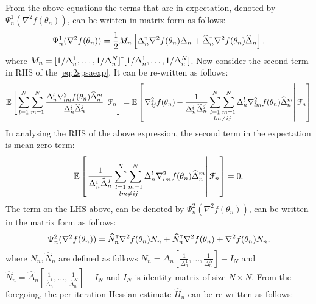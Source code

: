 From the above equations the  terms that are in expectation, denoted by  $\Psi_n^1(\nabla^2 f(\theta_n))$, can be written in matrix form as follows:
\begin{align}
\Psi_n^1(\nabla^2 f(\theta_n)) =\frac{1}{2} M_n \left[\Delta_n^\mathsf{\scriptscriptstyle T} \nabla^2 f(\theta_n) \Delta_n + \widehat\Delta_n^\mathsf{\scriptscriptstyle T} \nabla^2 f(\theta_n) \widehat\Delta_n\right].
\end{align}
where $M_n = [1/\Delta_n^1, \ldots ,1/\Delta_n^N]^\mathsf{\scriptscriptstyle T} [1/\Delta_n^1, \ldots ,1/\Delta_n^N]$.
Now consider the second term in RHS of the \eqref{eq:2spsaexp}. It can be re-written as follows:
\begin{align}
\mathbb{E}\left[\left. \sum\limits_{l=1}^N\sum\limits_{m=1}^N \frac{\Delta_n^l \nabla^2_{lm} f(\theta_n) \widehat\Delta_n^m}{\Delta_n^i \widehat\Delta_n^j} \right | \mathcal{F}_n\right] = \mathbb{E}\left[\left.\nabla^2_{ij} f(\theta_n) + \frac{1}{\Delta_n^i \widehat\Delta_n^j} \mathop{\sum_{l=1}^N \sum_{m=1}^{N}}_{lm \neq ij} \Delta_n^l \nabla^2_{lm} f(\theta_n) \widehat\Delta_n^m \right | \mathcal{F}_n\right]
\end{align}
In analysing the RHS of the above expression, the second term in the expectation  is mean-zero term:  
\begin{align}
\mathbb{E}\left[\left. \frac{1}{\Delta_n^i \widehat\Delta_n^j} \mathop{\sum_{l=1}^N \sum_{m=1}^{N}}_{lm \neq ij} \Delta_n^l \nabla^2_{lm} f(\theta_n) \widehat\Delta_n^m \right | \mathcal{F}_n\right] = 0.
\end{align}
The term on the LHS above, can be denoted by $\Psi_n^2(\nabla^2 f(\theta_n))$, can be written in the matrix form as follows:
\begin{align}
\Psi_n^2(\nabla^2 f(\theta_n)) = \widehat N_n^\mathsf{\scriptscriptstyle T} \nabla^2 f(\theta_n) N_n  + \widehat N_n^\mathsf{\scriptscriptstyle T} \nabla^2 f(\theta_n) + \nabla^2 f(\theta_n) N_n.
\end{align}
where $N_n,\widehat N_n$ are defined as follows $N_n = \Delta_n \left[\frac{1}{\Delta_n^1},\ldots,\frac{1}{\Delta_n^N}\right] - I_N$ and $\widehat N_n = \widehat \Delta_n \left [\frac{1}{\widehat\Delta_n^1},\ldots,\frac{1}{\widehat \Delta_n^N}\right] - I_N$ and $I_N$ is  identity matrix of size $N \times N$.
From the foregoing, the per-iteration Hessian estimate $\widehat H_n$ can be re-written as follows:

